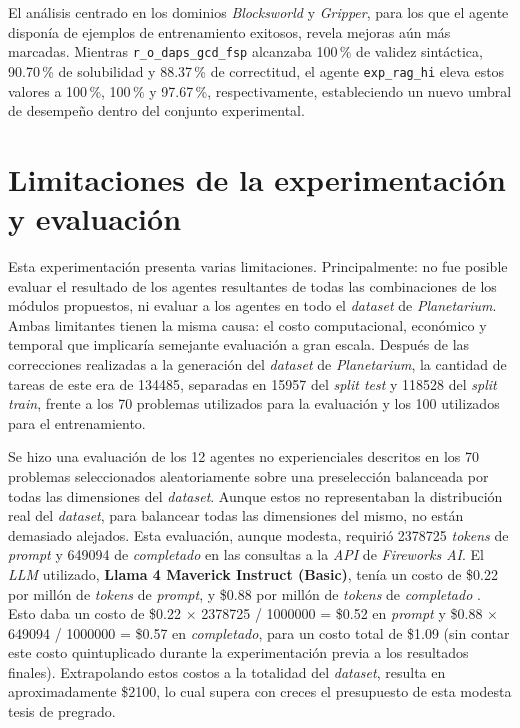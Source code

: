 El análisis centrado en los dominios \textit{Blocksworld} y \textit{Gripper}, para los que el agente disponía de ejemplos de entrenamiento exitosos, revela mejoras aún más marcadas. Mientras \texttt{r\_o\_daps\_gcd\_fsp} alcanzaba 100\,\% de validez sintáctica, 90.70\,\% de solubilidad y 88.37\,\% de correctitud, el agente \texttt{exp\_rag\_hi} eleva estos valores a 100\,\%, 100\,\% y 97.67\,\%, respectivamente, estableciendo un nuevo umbral de desempeño dentro del conjunto experimental.

\section{Limitaciones de la experimentación y evaluación}

Esta experimentación presenta varias limitaciones. Principalmente: no fue posible evaluar el resultado de los agentes resultantes de todas las combinaciones de los módulos propuestos, ni evaluar a los agentes en todo el \textit{dataset} de \textit{Planetarium}. Ambas limitantes tienen la misma causa: el costo computacional, económico y temporal que implicaría semejante evaluación a gran escala. Después de las correcciones realizadas a la generación del \textit{dataset} de \textit{Planetarium}, la cantidad de tareas de este era de 134485, separadas en 15957 del \textit{split test} y 118528 del \textit{split train}, frente a los 70 problemas utilizados para la evaluación y los 100 utilizados para el entrenamiento.

Se hizo una evaluación de los 12 agentes no experienciales descritos en los 70 problemas seleccionados aleatoriamente sobre una preselección balanceada por todas las dimensiones del \textit{dataset}. Aunque estos no representaban la distribución real del \textit{dataset}, para balancear todas las dimensiones del mismo, no están demasiado alejados. Esta evaluación, aunque modesta, requirió 2378725 \textit{tokens} de \textit{prompt} y 649094 de \textit{completado} en las consultas a la \textit{API} de \textit{Fireworks AI}. El \textit{LLM} utilizado, \textbf{Llama 4 Maverick Instruct (Basic)}, tenía un costo de \$0.22 por millón de \textit{tokens} de \textit{prompt}, y \$0.88 por millón de \textit{tokens} de \textit{completado} \parencite{fireworks2025llama4maverick}. Esto daba un costo de \$0.22 $\times$ 2378725 / 1000000 = \$0.52 en \textit{prompt} y \$0.88 $\times$ 649094 / 1000000 = \$0.57 en \textit{completado}, para un costo total de \$1.09 (sin contar este costo quintuplicado durante la experimentación previa a los resultados finales). Extrapolando estos costos a la totalidad del \textit{dataset}, resulta en aproximadamente \$2100, lo cual supera con creces el presupuesto de esta modesta tesis de pregrado.

